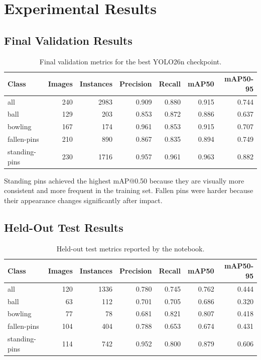 \documentclass[12pt,a4paper]{article}
\begin{document}
\section{Experimental Results}

\subsection{Final Validation Results}

\begin{table}[H]
\centering
\caption{Final validation metrics for the best YOLO26n checkpoint.}
\label{tab:val_metrics}
\begin{tabular}{lrrrrrr}
\toprule
\textbf{Class} & \textbf{Images} & \textbf{Instances} & \textbf{Precision} & \textbf{Recall} & \textbf{mAP50} & \textbf{mAP50-95} \\
\midrule
all & 240 & 2983 & 0.909 & 0.880 & 0.915 & 0.744 \\
ball & 129 & 203 & 0.853 & 0.872 & 0.886 & 0.637 \\
bowling & 167 & 174 & 0.961 & 0.853 & 0.915 & 0.707 \\
fallen-pins & 210 & 890 & 0.867 & 0.835 & 0.894 & 0.749 \\
standing-pins & 230 & 1716 & 0.957 & 0.961 & 0.963 & 0.882 \\
\bottomrule
\end{tabular}
\end{table}

Standing pins achieved the highest mAP@0.50 because they are visually more consistent and more frequent in the training set. Fallen pins were harder because their appearance changes significantly after impact.

\subsection{Held-Out Test Results}

\begin{table}[H]
\centering
\caption{Held-out test metrics reported by the notebook.}
\label{tab:test_metrics}
\begin{tabular}{lrrrrrr}
\toprule
\textbf{Class} & \textbf{Images} & \textbf{Instances} & \textbf{Precision} & \textbf{Recall} & \textbf{mAP50} & \textbf{mAP50-95} \\
\midrule
all & 120 & 1336 & 0.780 & 0.745 & 0.762 & 0.444 \\
ball & 63 & 112 & 0.701 & 0.705 & 0.686 & 0.320 \\
bowling & 77 & 78 & 0.681 & 0.821 & 0.807 & 0.418 \\
fallen-pins & 104 & 404 & 0.788 & 0.653 & 0.674 & 0.431 \\
standing-pins & 114 & 742 & 0.952 & 0.800 & 0.879 & 0.606 \\
\bottomrule
\end{tabular}
\end{table}
\end{document}
